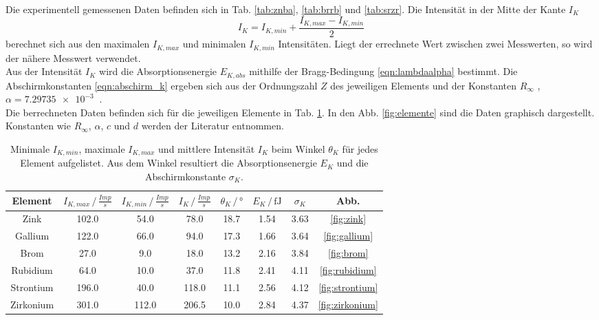 Die experimentell gemessenen Daten befinden sich in Tab. \ref{tab:znba}, \ref{tab:brrb} und \ref{tab:srzr}.
Die Intensität in der Mitte der Kante $I_K$
\begin{equation*}
    I_K = I_{K,min} + \frac{I_{K,max} - I_{K,min}}{2}
\end{equation*}
berechnet sich aus den maximalen $I_{K,max}$ und minimalen $I_{K,min}$ Intensitäten.
Liegt der errechnete Wert zwischen zwei Messwerten, so wird der nähere Messwert verwendet.
\\
Aus der Intensität $I_K$ wird die Absorptionsenergie $E_{K,abs}$ mithilfe der Bragg-Bedingung \eqref{eqn:lambdaalpha} bestimmt.
Die Abschirmkonstanten \eqref{eqn:abschirm_k} ergeben sich aus der Ordnungszahl $Z$ des jeweiligen Elements und der Konstanten $R_\infty$ \cite{anleitung}, $\alpha = \SI{7.29735e-3}{}$ \cite{konst}.
\\
Die berrechneten Daten befinden sich für die jeweiligen Elemente in Tab. \ref{tab:erg_elemente}.
In den Abb. \ref{fig:elemente} sind die Daten graphisch dargestellt.
Konstanten wie $R_\infty$, $\alpha$, $c$ \cite{konst} und $d$ \cite[3]{anleitung} werden der Literatur entnommen.
\begin{table}
    \centering
    \begin{tabular}{c|ccccccc}
    \toprule
    Element & $I_{K,max} \,/\, \si{\frac{Imp}{s}}$ & $I_{K,min} \,/\, \si{\frac{Imp}{s}}$ & $I_{K} \,/\, \si{\frac{Imp}{s}}$ & $\theta_K \,/\, \si{\degree}$ & $E_{K} \,/\, \si{\femto\joule}$ & $\sigma_K$ & Abb. \\
    \midrule
    Zink & 102.0 & 54.0 & 78.0 & 18.7 & 1.54 & 3.63 & \ref{fig:zink} \\
    Gallium & 122.0 & 66.0 & 94.0 & 17.3 & 1.66 & 3.64 & \ref{fig:gallium} \\
    Brom & 27.0 & 9.0 & 18.0 & 13.2 & 2.16 & 3.84 & \ref{fig:brom} \\
    Rubidium & 64.0 & 10.0 & 37.0 & 11.8 & 2.41 & 4.11 & \ref{fig:rubidium} \\
    Strontium & 196.0 & 40.0 & 118.0 & 11.1 & 2.56 & 4.12 & \ref{fig:strontium} \\
    Zirkonium & 301.0 & 112.0 & 206.5 & 10.0 & 2.84 & 4.37 & \ref{fig:zirkonium} \\
    \bottomrule
    \end{tabular}
    \caption{Minimale $I_{K,min}$, maximale $I_{K,max}$ und mittlere Intensität $I_K$ beim Winkel $\theta_K$ für jedes Element aufgelistet. Aus dem Winkel resultiert die Absorptionsenergie $E_K$ und die Abschirmkonstante $\sigma_K$.}
    \label{tab:erg_elemente}
\end{table}

